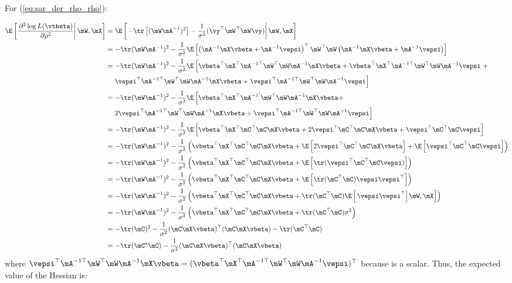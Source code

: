 \documentclass[english,12pt]{book}\usepackage[]{graphicx}\usepackage[]{xcolor}
\begin{document}
\begin{subappendices}
For (\ref{eq:sar_der_rho_rho}):

\begin{equation}\label{eq:E_der_rho_rho}
  \begin{aligned}
\E\left[\left.\frac{\partial^2 \log L(\vtheta)}{\partial \rho ^2}\right|\mW, \mX\right]  & =  \E\left[\left.- \tr\left[(\mW\mA^{-1})^2\right] - \frac{1}{\sigma^2}(\vy^{\top}\mW^{\top}\mW\vy)\right|\mW, \mX\right] \\
  & =  - \tr(\mW\mA^{-1})^2 - \frac{1}{\sigma^2} \E\left[\left(\mA^{-1}\mX\vbeta + \mA^{-1}\vepsi\right)^\top\mW^\top\mW\left(\mA^{-1}\mX\vbeta + \mA^{-1}\vepsi\right)\right] \\
 & =  - \tr(\mW\mA^{-1})^2 - \frac{1}{\sigma^2} \E\left[\vbeta^\top\mX^\top\mA^{-1\top}\mW^\top\mW\mA^{-1}\mX\vbeta + \vbeta^\top\mX^\top\mA^{-1\top}\mW^\top\mW\mA^{-1}\vepsi\right.  + \\  
 &\quad \left. \vepsi^\top\mA^{-1\top}\mW^\top\mW\mA^{-1}\mX\vbeta + \vepsi^\top\mA^{-1\top}\mW^\top\mW\mA^{-1}\vepsi\right] \\
  & = - \tr(\mW\mA^{-1})^2 - \frac{1}{\sigma^2}\E\left[\vbeta^\top\mX^\top\mA^{-1'}\mW^\top\mW\mA^{-1}\mX\vbeta + \right.\\
  &\quad\left. 2\vepsi^\top\mA^{-1\top}\mW^\top\mW\mA^{-1}\mX\vbeta + \vepsi^\top\mA^{-1\top}\mW^\top\mW\mA^{-1}\vepsi\right] \\
  & = - \tr(\mW\mA^{-1})^2 - \frac{1}{\sigma^2}\E\left[\vbeta^\top\mX^\top\mC^\top\mC\mX\vbeta + 2\vepsi^\top\mC^\top\mC\mX\vbeta + \vepsi^\top\mC^\top\mC\vepsi\right] \\
  & = - \tr(\mW\mA^{-1})^2 - \frac{1}{\sigma^2}\left(\vbeta^\top\mX^\top\mC^\top\mC\mX\vbeta + \E\left[2\vepsi^\top\mC^\top\mC\mX\vbeta\right]+ \E\left[\vepsi^\top\mC^\top\mC\vepsi\right]\right) \\
 & = - \tr(\mW\mA^{-1})^2 - \frac{1}{\sigma^2}\left(\vbeta^\top\mX^\top\mC^\top\mC\mX\vbeta +  \E\left[\tr(\vepsi^\top\mC^\top\mC\vepsi)\right]\right) \\
 & = - \tr(\mW\mA^{-1})^2 - \frac{1}{\sigma^2}\left(\vbeta^\top\mX^\top\mC^\top\mC\mX\vbeta +  \E\left[\tr(\mC^\top\mC)\vepsi\vepsi^\top\right]\right) \\
 & = - \tr(\mW\mA^{-1})^2 - \frac{1}{\sigma^2}\left(\vbeta^\top\mX^\top\mC^\top\mC\mX\vbeta +  \tr(\mC^\top\mC)\E\left[\left.\vepsi\vepsi^\top\right|\mW,\mX\right]\right) \\
 & = - \tr(\mW\mA^{-1})^2 - \frac{1}{\sigma^2}\left(\vbeta^\top\mX^\top\mC^\top\mC\mX\vbeta +  \tr(\mC^\top\mC)\sigma^2\right) \\
 & = - \tr(\mC)^2 - \frac{1}{\sigma^2}(\mC\mX\vbeta)^\top(\mC\mX\vbeta) - \tr(\mC^\top\mC) \\
 & = - \tr(\mC^s\mC) - \frac{1}{\sigma^2}(\mC\mX\vbeta)^\top(\mC\mX\vbeta)
\end{aligned}
\end{equation}
%
where $\vepsi^\top\mA^{-1\top}\mW^\top\mW\mA^{-1}\mX\vbeta = (\vbeta^\top\mX^\top\mA^{-1\top}\mW^\top\mW\mA^{-1}\vepsi)^\top$ because is a scalar. Thus, the expected value of the Hessian is:


\end{subappendices}
\end{document}
